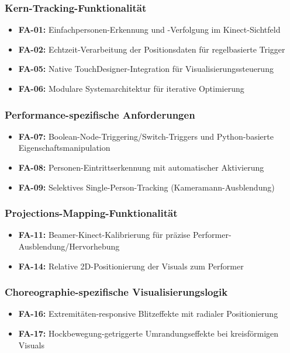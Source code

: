 \subsubsection{Kern-Tracking-Funktionalität}
\begin{itemize}
    \item \textbf{FA-01:} Einfachpersonen-Erkennung und -Verfolgung im Kinect-Sichtfeld
    \item \textbf{FA-02:} Echtzeit-Verarbeitung der Positionsdaten für regelbasierte Trigger
    \item \textbf{FA-05:} Native TouchDesigner-Integration für Visualisierungssteuerung
    \item \textbf{FA-06:} Modulare Systemarchitektur für iterative Optimierung
\end{itemize}

\subsubsection{Performance-spezifische Anforderungen}
\begin{itemize}
    \item \textbf{FA-07:} Boolean-Node-Triggering/Switch-Triggers und Python-basierte Eigenschaftsmanipulation
    \item \textbf{FA-08:} Personen-Eintrittserkennung mit automatischer Aktivierung
    \item \textbf{FA-09:} Selektives Single-Person-Tracking (Kameramann-Ausblendung)
\end{itemize}

\subsubsection{Projections-Mapping-Funktionalität}
\begin{itemize}
    \item \textbf{FA-11:} Beamer-Kinect-Kalibrierung für präzise Performer-Ausblendung/Hervorhebung
    \item \textbf{FA-14:} Relative 2D-Positionierung der Visuals zum Performer
\end{itemize}

\subsubsection{Choreographie-spezifische Visualisierungslogik}
\begin{itemize}
    \item \textbf{FA-16:} Extremitäten-responsive Blitzeffekte mit radialer Positionierung
    \item \textbf{FA-17:} Hockbewegung-getriggerte Umrandungseffekte bei kreisförmigen Visuals
\end{itemize}